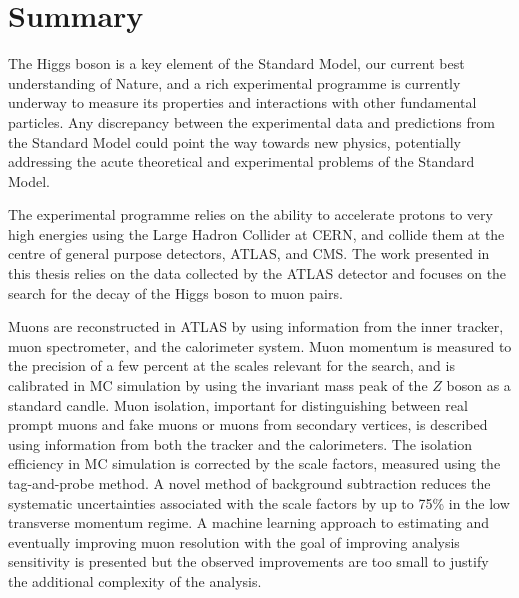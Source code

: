 \chapter*{Summary}

The Higgs boson is a key element of the Standard Model,
our current best understanding of Nature, and a rich experimental
programme is currently underway to measure its properties
and interactions with other fundamental particles. Any
discrepancy between the experimental data and predictions
from the Standard Model could point the way towards new
physics, potentially addressing the acute theoretical
and experimental problems of the Standard Model.

The experimental programme relies on the ability to
accelerate protons to very high energies using the Large
Hadron Collider at CERN, and collide them at the centre of
general purpose detectors, ATLAS, and CMS. The work presented
in this thesis relies on the data collected by the ATLAS
detector and focuses on the search for the decay of the
Higgs boson to muon pairs.

Muons are reconstructed in ATLAS by using information
from the inner tracker, muon spectrometer, and the
calorimeter system. Muon momentum is measured to the
precision of a few percent at the scales relevant for
the search, and is calibrated in MC simulation by using
the invariant mass peak of the $Z$ boson as a standard
candle. Muon isolation, important for distinguishing
between real prompt muons and fake muons or muons from
secondary vertices, is described using information from
both the tracker and the calorimeters. The isolation
efficiency in MC simulation is corrected by the scale
factors, measured using the tag-and-probe method. A
novel method of background subtraction reduces the
systematic uncertainties associated with the
scale factors by up to 75\% in the low transverse
momentum regime. A machine learning approach to
estimating and eventually improving muon resolution
with the goal of improving analysis sensitivity is
presented but the observed improvements are too small
to justify the additional complexity of the analysis.







